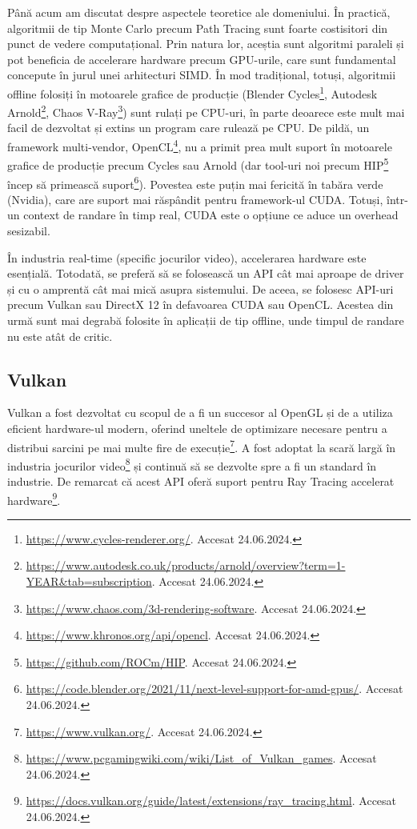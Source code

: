 \documentclass[12pt,a4paper]{report}
\numberwithin{equation}{section} %
\begin{document}
Până acum am discutat despre aspectele teoretice ale domeniului. În practică,
algoritmii de tip Monte Carlo precum Path Tracing sunt foarte costisitori din
punct de vedere computațional. Prin natura lor, aceștia sunt algoritmi paraleli
și pot beneficia de accelerare hardware precum GPU-urile, care sunt fundamental
concepute în jurul unei arhitecturi SIMD. În mod tradițional, totuși, algoritmii
offline folosiți în motoarele grafice de producție (Blender Cycles\footnote{\url{https://www.cycles-renderer.org/}. Accesat 24.06.2024.},
Autodesk Arnold\footnote{\url{https://www.autodesk.co.uk/products/arnold/overview?term=1-YEAR&tab=subscription}. Accesat 24.06.2024.},
Chaos V-Ray\footnote{\url{https://www.chaos.com/3d-rendering-software}. Accesat 24.06.2024.})
sunt rulați pe CPU-uri, în parte deoarece este
mult mai facil de dezvoltat și extins un program care rulează pe CPU. De pildă,
un framework multi-vendor, OpenCL\footnote{\url{https://www.khronos.org/api/opencl}. Accesat 24.06.2024.},
nu a primit prea mult suport în motoarele grafice de producție precum Cycles sau Arnold
(dar tool-uri noi precum HIP\footnote{\url{https://github.com/ROCm/HIP}. Accesat 24.06.2024.}
încep să primească suport\footnote{\url{https://code.blender.org/2021/11/next-level-support-for-amd-gpus/}. Accesat 24.06.2024.}).
Povestea este puțin mai
fericită în tabăra verde (Nvidia), care are suport mai răspândit pentru framework-ul
CUDA. Totuși, într-un context de randare în timp real, CUDA este o opțiune ce
aduce un overhead sesizabil.

În industria real-time (specific jocurilor video), accelerarea hardware este
esențială. Totodată, se preferă să se folosească un API cât mai aproape de driver
și cu o amprentă cât mai mică asupra sistemului. De aceea, se folosesc API-uri
precum Vulkan sau DirectX 12 în defavoarea CUDA sau OpenCL. Acestea din urmă sunt
mai degrabă folosite în aplicații de tip offline, unde timpul de randare nu este
atât de critic.

\subsection{Vulkan}

Vulkan a fost dezvoltat cu scopul de a fi un succesor al OpenGL și de a utiliza
eficient hardware-ul modern, oferind uneltele de optimizare necesare
pentru a distribui sarcini pe mai multe fire de execuție\footnote{\url{https://www.vulkan.org/}. Accesat 24.06.2024.}.
A fost adoptat la scară largă în industria jocurilor video\footnote{\url{https://www.pcgamingwiki.com/wiki/List_of_Vulkan_games}. Accesat 24.06.2024.}
și continuă să se dezvolte spre a fi un standard în industrie.
De remarcat că acest API oferă suport pentru Ray Tracing accelerat hardware\footnote{\url{https://docs.vulkan.org/guide/latest/extensions/ray_tracing.html}. Accesat 24.06.2024.}.
\end{document}
